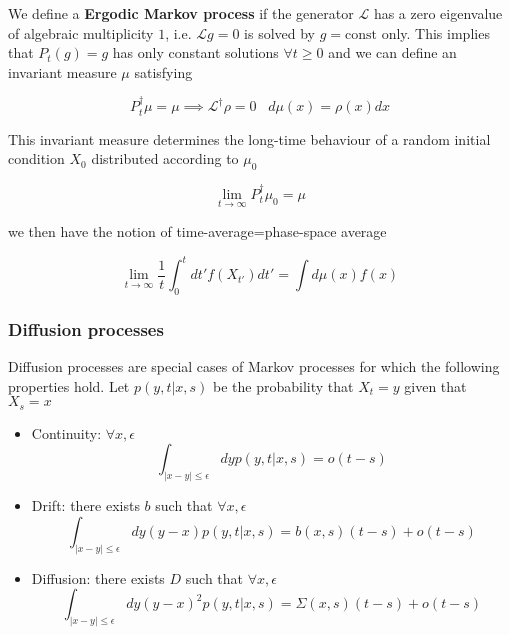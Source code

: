 \documentclass[11pt,a4paper]{article}
\begin{document}
We define a \textbf{Ergodic Markov process} if the generator $\mathcal{L}$ has a zero eigenvalue of algebraic multiplicity $1$, i.e. $\mathcal{L}g = 0$ is solved by $g= \text{const}$ only. This implies that $P_t(g) = g$ has only constant solutions $\forall t \geq 0$ and we can define an invariant measure $\mu$ satisfying 

\begin{equation}
    P^{\dagger}_t \mu = \mu \implies \mathcal{L}^{\dagger} \rho = 0 \hspace{10pt} d\mu(x) = \rho(x)dx
\end{equation}


This invariant measure determines the long-time behaviour of a random initial condition $X_0$ distributed according to $\mu_0$

\begin{equation}
    \lim_{t \to \infty}P^{\dagger}_t\mu_0 = \mu
\end{equation}

we then have the notion of time-average=phase-space average

\begin{equation}
    \lim_{t \to \infty}\frac{1}{t}\int_{0}^{t} dt'f(X_{t'})dt' = \int d\mu(x) f(x)
\end{equation}

\subsubsection{Diffusion processes}

Diffusion processes are special cases of Markov processes for which the following properties hold. Let $p(y,t|x,s)$ be the probability that $X_t = y$ given that $X_s = x$

\begin{itemize}
    \item Continuity: $\forall x, \epsilon$
    \begin{equation}
        \int_{|x-y|\leq \epsilon}dyp(y,t|x,s) = o(t-s)
    \end{equation}
    \item Drift: there exists $b$ such that $\forall x, \epsilon$
    \begin{equation}
        \int_{|x-y|\leq \epsilon}dy(y-x)p(y,t|x,s) = b(x,s)(t-s) + o(t-s)
    \end{equation}
    \item Diffusion: there exists $D$ such that $\forall x, \epsilon$
    \begin{equation}
            \int_{|x-y|\leq \epsilon}dy(y-x)^2p(y,t|x,s) = \Sigma(x,s)(t-s) + o(t-s)
    \end{equation}
\end{itemize}
\end{document}
